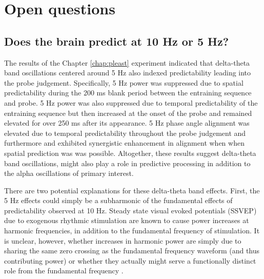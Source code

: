 \documentclass[dwyatte_dissertation.tex]{subfiles}
\begin{document}
\section{Open questions}

\subsection{Does the brain predict at 10 Hz or 5 Hz?}
The results of the Chapter \ref{chap:pleast} experiment indicated that delta-theta band oscillations centered around 5 Hz also indexed predictability leading into the probe judgement. Specifically, 5 Hz power was suppressed due to spatial predictability during the 200 ms blank period between the entraining sequence and probe. 5 Hz power was also suppressed due to temporal predictability of the entraining sequence but then increased at the onset of the probe and remained elevated for over 250 ms after its appearance. 5 Hz phase angle alignment was elevated due to temporal predictability throughout the probe judgement and furthermore and exhibited synergistic enhancement in alignment when when spatial prediction was was possible. Altogether, these results suggest delta-theta band oscillations, might also play a role in predictive processing in addition to the alpha oscillations of primary interest.

There are two potential explanations for these delta-theta band effects. First, the 5 Hz effects could simply be a subharmonic of the fundamental effects of predictability observed at 10 Hz. Steady state visual evoked potentials (SSVEP) due to exogenous rhythmic stimulation are known to cause power increases at harmonic frequencies, in addition to the fundamental frequency of stimulation. It is unclear, however, whether increases in harmonic power are simply due to sharing the same zero crossing as the fundamental frequency waveform (and thus contributing power) or whether they actually might serve a functionally distinct role from the fundamental frequency \cite[e.g.,]{Herrmann01,KimGraboweckyPallerEtAl11}. 
\end{document}
